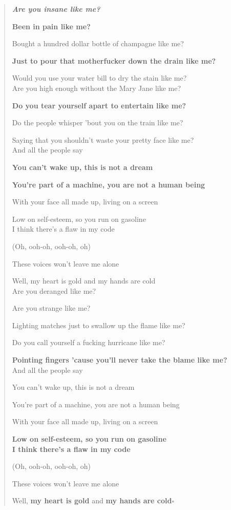 \documentclass{book}
\numberwithin{equation}{section}
\begin{document}
\begin{quotation}\it
    \textbf{Are you insane like me?}
    
    \textbf{Been in pain like me?}
    
    Bought a hundred dollar bottle of champagne like me?
    
    \textbf{Just to pour that motherfucker down the drain like me?}
    
    Would you use your water bill to dry the stain like me?
    \\
    
    Are you high enough without the Mary Jane like me?
    
    \textbf{Do you tear yourself apart to entertain like me?}
    
    Do the people whisper 'bout you on the train like me?
    
    Saying that you shouldn't waste your pretty face like me?
    \\
    
    And all the people say
    
    \textbf{You can't wake up, this is not a dream}
    
    \textbf{You're part of a machine, you are not a human being}
    
    With your face all made up, living on a screen
    
    Low on self-esteem, so you run on gasoline
    \\
    
    I think there's a flaw in my code
    
    (Oh, ooh-oh, ooh-oh, oh)
    
    These voices won't leave me alone
    
    Well, my heart is gold and my hands are cold
    \\
    
    Are you deranged like me?
    
    Are you strange like me?
    
    Lighting matches just to swallow up the flame like me?
    
    Do you call yourself a fucking hurricane like me?
    
    \textbf{Pointing fingers 'cause you'll never take the blame like me?}
    \\
    
    And all the people say
    
    You can't wake up, this is not a dream
    
    You're part of a machine, you are not a human being
    
    With your face all made up, living on a screen
    
    \textbf{Low on self-esteem, so you run on gasoline}
    \\
    
    \textbf{I think there's a flaw in my code}
    
    (Oh, ooh-oh, ooh-oh, oh)
    
    These voices won't leave me alone
    
    Well, \textbf{my heart is gold} and \textbf{my hands are cold}\hfill$\square$
\end{quotation}
\end{document}
